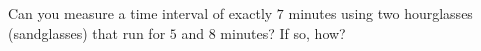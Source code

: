 Can you measure a time interval of exactly $7$ minutes using two hourglasses (sandglasses) that run for $5$ and $8$ minutes? If so, how?

